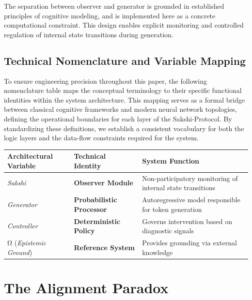 \documentclass[12pt,a4paper]{article}
\begin{document}
The separation between observer and generator is grounded in established principles of cognitive modeling, and is implemented here as a concrete computational constraint. This design enables explicit monitoring and controlled regulation of internal state transitions during generation.

\subsection{Technical Nomenclature and Variable Mapping}
To ensure engineering precision throughout this paper, the following nomenclature table maps the conceptual terminology to their specific functional identities within the system architecture. This mapping serves as a formal bridge between classical cognitive frameworks and modern neural network topologies, defining the operational boundaries for each layer of the Sakshi-Protocol. By standardizing these definitions, we establish a consistent vocabulary for both the logic layers and the data-flow constraints required for the system.

\begin{table}[H] 
\centering
\renewcommand{\arraystretch}{2.0} 
\begin{tabularx}{\textwidth}{|>{\RaggedRight\arraybackslash}p{3.5cm}|>{\Centering\arraybackslash}p{3.5cm}|>{\RaggedRight\arraybackslash}X|}
\hline
\textbf{Architectural Variable} & \textbf{Technical Identity} & \textbf{System Function} \\ \hline

\textit{Sakshi} & 
\textbf{Observer Module} & 
Non-participatory monitoring of internal state transitions \\ \hline

\textit{Generator} & 
\textbf{Probabilistic Processor} & 
Autoregressive model responsible for token generation \\ \hline

\textit{Controller} & 
\textbf{Deterministic Policy} & 
Governs intervention based on diagnostic signals \\ \hline

Ω (\textit{Epistemic Ground})& 
\textbf{Reference System} & 
Provides grounding via external knowledge \\ \hline
\end{tabularx}
\end{table}

\section{The Alignment Paradox}
\end{document}
